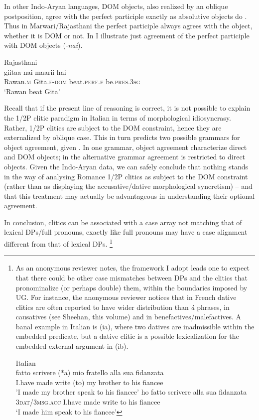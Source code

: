 \documentclass[output=paper,colorlinks,citecolor=brown,nonflat]{./langscibook}
\begin{document}
In other Indo-Aryan languages, DOM objects, also realized by an oblique postposition, agree with the perfect participle exactly as absolutive objects do \emph{\textup{\citep[342]{Masica1991}}}. Thus in Marwari/Rajasthani the perfect participle always agrees with the object, whether it is DOM or not. In  I illustrate just agreement of the perfect participle with DOM objects (-\textit{nai}).

\ea%
    \label{ex:manzini:19}
    Rajasthani \citep{Khokhlova2002}\\
       {giitaa-nai}  {maarii}    {hai}\\
        Rawan\textsc{.m}   Gita.\textsc{f-dom}   beat.\textsc{perf.f}    be.\textsc{pres.3sg}\\
    \glt ‘Rawan beat Gita’
\z

Recall that if the present line of reasoning is correct, it is not possible to explain the 1/2P clitic paradigm in Italian in terms of morphological idiosyncrasy. Rather, 1/2P clitics are subject to the DOM constraint, hence they are externalized by oblique case. This in turn predicts two possible grammars for object agreement, given . In one grammar, object agreement characterize direct and DOM objects; in the alternative grammar agreement is restricted to direct objects. Given the Indo-Aryan data, we can safely conclude that nothing stands in the way of analysing Romance 1/2P clitics as subject to the DOM constraint (rather than as displaying the accusative/dative morphological syncretism) – and that this treatment may actually be advantageous in understanding their optional agreement. 

In conclusion, clitics can be associated with a case array not matching that of lexical DPs/full pronouns, exactly like full pronouns may have a case alignment different from that of lexical DPs.{} \footnote{As an anonymous reviewer notes, the framework I adopt leads one to expect that there could be other case mismatches between DPs and the clitics that pronominalize (or perhaps double) them, within the boundaries imposed by UG. For instance, the anonymous reviewer notices that in French dative clitics are often reported to have wider distribution than \textit{à} phrases, in causatives (see Sheehan, this volume) and in benefactives/malefactives. A banal example in Italian is (ia), where two datives are inadmissible within the embedded predicate, but a dative clitic is a possible lexicalization for the embedded external argument in (ib). 

\ea%
    
    Italian\\
    \ea {} {fatto} {scrivere} (*a) {mio} {fratello} {alla} {sua} {fidanzata}\\
        {I.have} made write (to) my brother to his fiancee\\
    \glt 'I made my brother speak to his fiancee'
    \ex {}     {ho} {fatto} {scrivere}   {alla} {sua} {fidanzata}\\
        {3\textsc{dat}/\textsc{3msg.acc}} {I.have} made write   to his fiancee\\
    \glt ‘I made him speak to his fiancee’
    \z
\z
}
\end{document}
